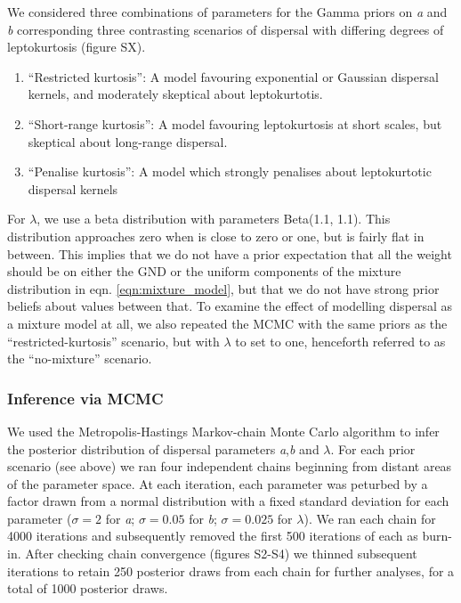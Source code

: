 \documentclass[10pt, a4paper, twocolumn]{article} %
\begin{document}
We considered three combinations of parameters for the Gamma priors on \textit{a} and \textit{b} corresponding three contrasting scenarios of dispersal with differing degrees of leptokurtosis (figure SX).
\begin{enumerate}
\item “Restricted kurtosis”:  A model favouring exponential or Gaussian dispersal kernels, and moderately skeptical about leptokurtotis.
\item “Short-range kurtosis”: A model favouring leptokurtosis at short scales, but skeptical about long-range dispersal.
\item “Penalise kurtosis”: A model which strongly penalises about leptokurtotic dispersal kernels
\end{enumerate}

For $\lambda$, we use a beta distribution with parameters Beta(1.1, 1.1). This distribution approaches zero when  is close to zero or one, but is fairly flat in between. This implies that we do not have a prior expectation that all the weight should be on either the GND or the uniform components of the mixture distribution in eqn. \ref{eqn:mixture_model}, but that we do not have strong prior beliefs about values between that. To examine the effect of modelling dispersal as a mixture model at all, we also repeated the MCMC with the same priors as the “restricted-kurtosis” scenario, but with $\lambda$ to set to one, henceforth referred to as the “no-mixture” scenario.

\subsubsection{Inference via MCMC}

We used the Metropolis-Hastings Markov-chain Monte Carlo algorithm to infer the posterior distribution of dispersal parameters \textit{a},\textit{b} and $\lambda$. For each prior scenario (see above) we ran four independent chains beginning from distant areas of the parameter space. At each iteration, each parameter was peturbed by a factor drawn from a normal distribution with a fixed standard deviation for each parameter ($\sigma= 2$ for \textit{a}; $\sigma= 0.05$ for \textit{b}; $\sigma= 0.025$ for $\lambda$). We ran each chain for 4000 iterations and subsequently removed the first 500 iterations of each as burn-in. After checking chain convergence (figures S2-S4) we thinned
subsequent iterations to retain 250 posterior draws from each chain for further analyses, for a total of 1000 posterior draws.
\end{document}
